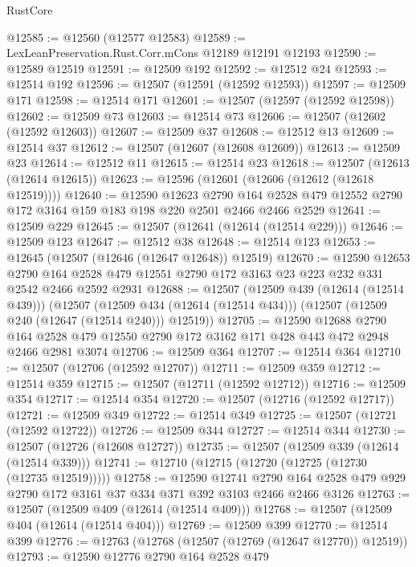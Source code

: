 \begin{lexlean}{RustCore}
\begin{coremodule}
@12585 := @12560 (@12577 @12583)
@12589 := LexLeanPreservation.Rust.Corr.mCons @12189 @12191 @12193
@12590 := @12589 @12519
@12591 := @12509 @192
@12592 := @12512 @24
@12593 := @12514 @192
@12596 := @12507 (@12591 (@12592 @12593))
@12597 := @12509 @171
@12598 := @12514 @171
@12601 := @12507 (@12597 (@12592 @12598))
@12602 := @12509 @73
@12603 := @12514 @73
@12606 := @12507 (@12602 (@12592 @12603))
@12607 := @12509 @37
@12608 := @12512 @13
@12609 := @12514 @37
@12612 := @12507 (@12607 (@12608 @12609))
@12613 := @12509 @23
@12614 := @12512 @11
@12615 := @12514 @23
@12618 := @12507 (@12613 (@12614 @12615))
@12623 := @12596 (@12601 (@12606 (@12612 (@12618 @12519))))
@12640 := @12590
    @12623
    @2790
    @164
    @2528
    @479
    @12552
    @2790
    @172
    @3164
    @159
    @183
    @198
    @220
    @2501
    @2466
    @2466
    @2529
@12641 := @12509 @229
@12645 := @12507 (@12641 (@12614 (@12514 @229)))
@12646 := @12509 @123
@12647 := @12512 @38
@12648 := @12514 @123
@12653 := @12645 (@12507 (@12646 (@12647 @12648)) @12519)
@12670 := @12590
    @12653
    @2790
    @164
    @2528
    @479
    @12551
    @2790
    @172
    @3163
    @23
    @223
    @232
    @331
    @2542
    @2466
    @2592
    @2931
@12688 := @12507
    (@12509 @439 (@12614 (@12514 @439)))
    (@12507
      (@12509 @434 (@12614 (@12514 @434)))
      (@12507 (@12509 @240 (@12647 (@12514 @240))) @12519))
@12705 := @12590
    @12688
    @2790
    @164
    @2528
    @479
    @12550
    @2790
    @172
    @3162
    @171
    @428
    @443
    @472
    @2948
    @2466
    @2981
    @3074
@12706 := @12509 @364
@12707 := @12514 @364
@12710 := @12507 (@12706 (@12592 @12707))
@12711 := @12509 @359
@12712 := @12514 @359
@12715 := @12507 (@12711 (@12592 @12712))
@12716 := @12509 @354
@12717 := @12514 @354
@12720 := @12507 (@12716 (@12592 @12717))
@12721 := @12509 @349
@12722 := @12514 @349
@12725 := @12507 (@12721 (@12592 @12722))
@12726 := @12509 @344
@12727 := @12514 @344
@12730 := @12507 (@12726 (@12608 @12727))
@12735 := @12507 (@12509 @339 (@12614 (@12514 @339)))
@12741 := @12710 (@12715 (@12720 (@12725 (@12730 (@12735 @12519)))))
@12758 := @12590
    @12741
    @2790
    @164
    @2528
    @479
    @929
    @2790
    @172
    @3161
    @37
    @334
    @371
    @392
    @3103
    @2466
    @2466
    @3126
@12763 := @12507 (@12509 @409 (@12614 (@12514 @409)))
@12768 := @12507 (@12509 @404 (@12614 (@12514 @404)))
@12769 := @12509 @399
@12770 := @12514 @399
@12776 := @12763 (@12768 (@12507 (@12769 (@12647 @12770)) @12519))
@12793 := @12590
    @12776
    @2790
    @164
    @2528
    @479

\end{coremodule}
\end{lexlean}
